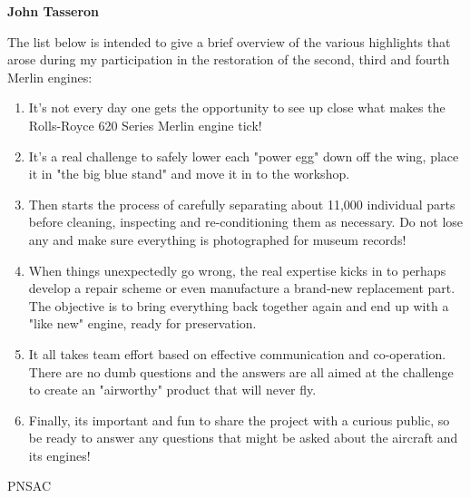 \textbf{John Tasseron}

The list below is intended to give a brief overview of the various highlights
that arose during my participation in the restoration of the second, third and
fourth Merlin engines:

\begin{enumerate}
  \item It's not every day one gets the opportunity to see up close what makes
the Rolls-Royce 620 Series Merlin engine tick!
  \item It's a real challenge to safely lower each "power egg" down off the
wing, place it in "the big blue stand" and move it in to the workshop.
  \item Then starts the process of carefully separating about 11,000 individual
parts before cleaning, inspecting and re-conditioning them as necessary. Do not
lose any and make sure everything is photographed for museum records!
  \item When things unexpectedly go wrong, the real expertise kicks in to
perhaps develop a repair scheme or even manufacture a brand-new replacement
part. The objective is to bring everything back together again and end up with
a "like new" engine, ready for preservation.
  \item It all takes team effort based on effective communication and
co-operation. There are no dumb questions and the answers are all aimed at the
challenge to create an "airworthy" product that will never fly.
  \item Finally, its important and fun to share the project with a curious
public, so be ready to answer any questions that might be asked about the
aircraft and its engines!
\end{enumerate}



%
%
%
%
%

\begin{footnotesize}
    \raggedleft PNSAC\\
\end{footnotesize}





